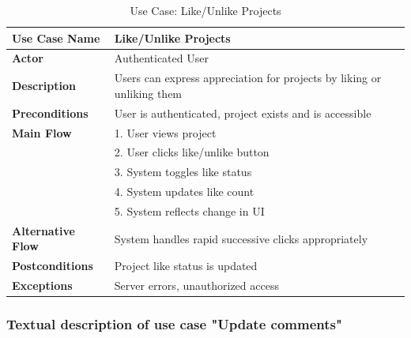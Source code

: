 \begin{table}[H]
\centering
\caption{Use Case: Like/Unlike Projects}
\begin{tabular}{|p{3cm}|p{10cm}|}
\hline
\textbf{Use Case Name} & Like/Unlike Projects \\
\hline
\textbf{Actor} & Authenticated User \\
\hline
\textbf{Description} & Users can express appreciation for projects by liking or unliking them \\
\hline
\textbf{Preconditions} & User is authenticated, project exists and is accessible \\
\hline
\textbf{Main Flow} & 
1. User views project \\
& 2. User clicks like/unlike button \\
& 3. System toggles like status \\
& 4. System updates like count \\
& 5. System reflects change in UI \\
\hline
\textbf{Alternative Flow} & System handles rapid successive clicks appropriately \\
\hline
\textbf{Postconditions} & Project like status is updated \\
\hline
\textbf{Exceptions} & Server errors, unauthorized access \\
\hline
\end{tabular}
\end{table}

\subsubsection{Textual description of use case "Update comments"}


